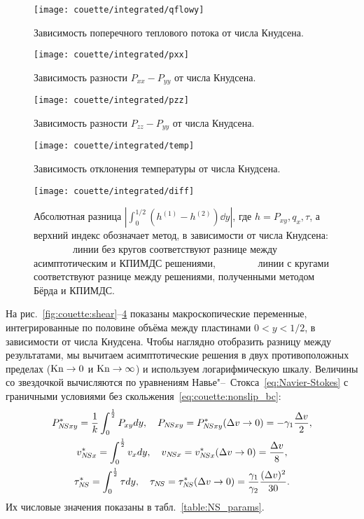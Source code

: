 \begin{figure}
    \centering
    \texttt{[image: couette/integrated/qflowy]}
    \caption{Зависимость поперечного теплового потока от числа Кнудсена.}
    \label{fig:couette:qflowy}
\end{figure}

\begin{figure}
    \centering
    \texttt{[image: couette/integrated/pxx]}
    \caption{Зависимость разности \(P_{xx}-P_{yy}\) от числа Кнудсена.}
    \label{fig:couette:pxx}
\end{figure}

\begin{figure}
    \centering
    \texttt{[image: couette/integrated/pzz]}
    \caption{Зависимость разности \(P_{zz}-P_{yy}\) от числа Кнудсена.}
    \label{fig:couette:pzz}
\end{figure}

\begin{figure}
    \centering
    \texttt{[image: couette/integrated/temp]}
    \caption{Зависимость отклонения температуры от числа Кнудсена.}
    \label{fig:couette:temp}
\end{figure}

\begin{figure}
    \centering
    \texttt{[image: couette/integrated/diff]}
    \caption{Абсолютная разница \(|\int_0^{1/2} (h^{(1)}-h^{(2)})\dd{y}|\),
        где \(h = P_{xy}, q_x, \tau\), а верхний индекс обозначает метод, в зависимости от числа Кнудсена:
        линии без кругов соответствуют разнице между асимптотическим и КПИМДС решениями,
        линии с кругами соответствуют разнице между решениями, полученными методом Бёрда и КПИМДС.}
    \label{fig:couette:diff}
\end{figure}

На рис.~\ref{fig:couette:shear}--\ref{fig:couette:temp} показаны макроскопические переменные,
интегрированные по половине объёма между пластинами \(0<y<1/2\), в зависимости от числа Кнудсена.
Чтобы наглядно отобразить разницу между результатами, мы вычитаем асимптотические решения
в двух противоположных пределах (\(\mathrm{Kn}\to0\) и \(\mathrm{Kn}\to\infty\)) и используем логарифмическую шкалу.
Величины со звездочкой вычисляются по уравнениям Навье"--~Стокса~\eqref{eq:Navier-Stokes}
с граничными условиями без скольжения~\eqref{eq:couette:nonslip_bc}:
\begin{gather*}
    P_{\NS xy}^* = \frac1k \int_0^\frac12 P_{xy} \dd{y}, \quad P_{\NS xy} = P_{\NS xy}^*(\Delta{v}\to0) = -\gamma_1\frac{\Delta{v}}2, \\
    v_{\NS x}^* = \int_0^\frac12 v_x \dd{y}, \quad v_{\NS x} = v_{\NS x}^*(\Delta{v}\to0) = \frac{\Delta{v}}8, \\
    \tau_{\NS}^* = \int_0^\frac12 \tau \dd{y}, \quad
        \tau_{\NS} = \tau_{\NS}^*(\Delta{v}\to0) = \frac{\gamma_1}{\gamma_2}\frac{(\Delta{v})^2}{30}.
\end{gather*}
Их числовые значения показаны в табл.~\ref{table:NS_params}.

